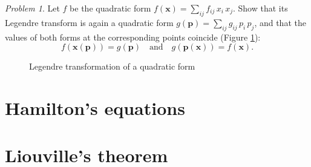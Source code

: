 \documentclass[leqno]{report}
\numberwithin{equation}{section}
\theoremstyle{plain}
\theoremstyle{definition}
\theoremstyle{remark}
\theoremstyle{smallcap}
\newtheorem*{prob*}{Problem}
\numberwithin{prob}{section}
\begin{document}
\begin{prob*}
  Let $f$ be the quadratic form
  $f(\mathbf x) = \sum_{ij} f_{ij} \, x_i \, x_j$.
  Show that its Legendre transform is again
  a quadratic form $g(\mathbf p) = \sum_{ij} g_{ij} \, p_i \, p_j$,
  and that the values of both forms
  at the corresponding points coincide
  (Figure \ref{fig:Legendre_transformation_quadratic}):
  $$
  f(\mathbf x(\mathbf p)) = g(\mathbf p)
  \quad
  \mathrm{and}
  \quad
  g(\mathbf p(\mathbf x)) = f(\mathbf x).
  $$

  \begin{figure}[h]
    \centering
    \caption{
      \label{fig:Legendre_transformation_quadratic}
      Legendre transformation
      of a quadratic form
    }
  \end{figure}

\end{prob*}

\section{Hamilton's equations}

\section{Liouville's theorem}
\end{document}
